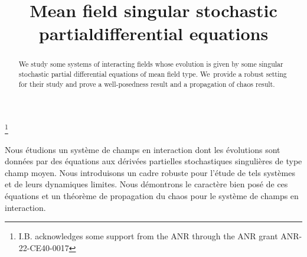 \documentclass[JEP,XML,SOM,Unicode,published]{cedram}
\theoremstyle{definition}
\begin{document}
\title{Mean field singular stochastic partial\nobreakspace differential equations}

\author[\initial{I.} \lastname{Bailleul}]{ }
\address{Univ Brest, CNRS, LMBA - UMR 6205\\
F-29238 Brest, France}

\author[\initial{N.} \lastname{Moench}]{ }
\address{Univ. Rennes, CNRS, IRMAR - UMR 6625\\
F-35000 Rennes, France}

\thanks{I.B. acknowledges some support from the ANR through the ANR grant ANR-22-CE40-0017}

\begin{abstract}
We study some systems of interacting fields whose evolution is given by some singular stochastic partial differential equations of mean field type. We~provide a robust setting for their study and prove a well-posedness result and a propagation of chaos result.
\end{abstract}





\begin{altabstract}
Nous étudions un système de champs en interaction dont les évolutions sont données par des équations aux dérivées partielles stochastiques singulières de type champ moyen. Nous introduisons un cadre robuste pour l'étude de tels systèmes et de leurs dynamiques limites. Nous démontrons le caractère bien posé de ces équations et un théorème de propagation du chaos pour le système de champs en interaction.\end{altabstract}

\maketitle
\vspace*{-\baselineskip}
\tableofcontents
\end{document}
